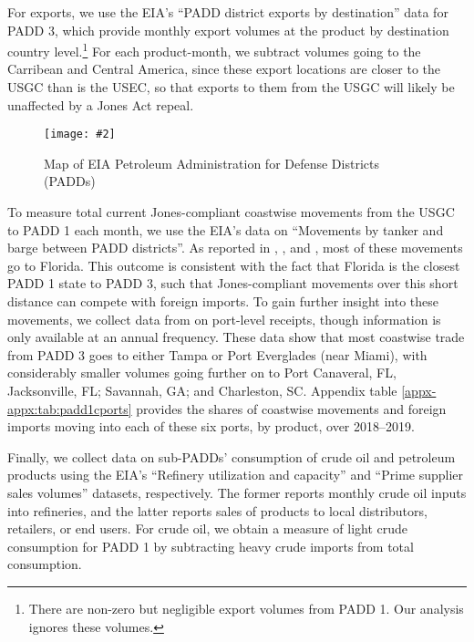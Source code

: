 \documentclass[12pt]{article}
\newlength{\figwidth}
\newcommand{\figinpt}[2]{
    \settowidth{\figwidth}{\texttt{[image: \#2]}}
    \centering
    \texttt{[image: \#2]}}
\newcommand{\fignote}[2][\linewidth]{
    \begin{minipage}[]{#1}
        \vspace{12pt}
        \fignotefont{#2}
    \end{minipage}}
\begin{document}
For exports, we use the EIA's ``PADD district exports by destination'' data for PADD 3, which provide monthly export volumes at the product by destination country level.\footnote{There are non-zero but negligible export volumes from PADD 1. Our analysis ignores these volumes.} For each product-month, we subtract volumes going to the Carribean and Central America, since these export locations are closer to the USGC than is the USEC, so that exports to them from the USGC will likely be unaffected by a Jones Act repeal.


\begin{figure}[!t]
\captionsetup{width=1.0\textwidth}
\caption{Map of EIA Petroleum Administration for Defense Districts (PADDs)}
\figinpt{width=1.0\textwidth,clip}{EIA_PADDmap_notitle.pdf}
\fignote[0.75\textwidth]{Source: \citet{EIAPADDs}}
\label{fig:paddmap}
\end{figure}


To measure total current Jones-compliant coastwise movements from the USGC to PADD 1 each month, we use the EIA's data on ``Movements by tanker and barge between PADD districts''. As reported in \cite{EIAFL}, \cite{EIAeastgulfcoasts}, and \cite{EIAFL2023}, most of these movements go to Florida. This outcome is consistent with the fact that Florida is the closest PADD 1 state to PADD 3, such that Jones-compliant movements over this short distance can compete with foreign imports. To gain further insight into these movements, we collect data from \cite{Army2023} on port-level receipts, though information is only available at an annual frequency. These data show that most coastwise trade from PADD 3 goes to either Tampa or Port Everglades (near Miami), with considerably smaller volumes going further on to Port Canaveral, FL, Jacksonville, FL; Savannah, GA; and Charleston, SC. Appendix table \ref{appx-appx:tab:padd1cports} provides the shares of coastwise movements and foreign imports moving into each of these six ports, by product, over 2018--2019.

Finally, we collect data on sub-PADDs' consumption of crude oil and petroleum products using the EIA's ``Refinery utilization and capacity'' and ``Prime supplier sales volumes'' datasets, respectively. The former reports monthly crude oil inputs into refineries, and the latter reports sales of products to local distributors, retailers, or end users. For crude oil, we obtain a measure of light crude consumption for PADD 1 by subtracting heavy crude imports from total consumption.
\end{document}
